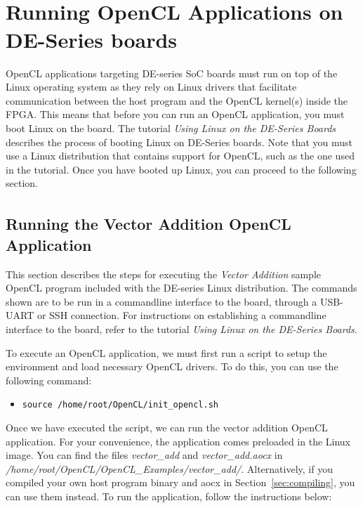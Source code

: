 \documentclass[11pt, twoside, pdftex]{article}
\begin{document}
\section{Running OpenCL\textsuperscript{\texttrademark} Applications on DE-Series boards}
\label{sec:run_app}

OpenCL applications targeting DE-series SoC boards must run on top of the Linux operating system as they rely on Linux drivers that facilitate communication between the host program and the OpenCL kernel(s) inside the FPGA. This means that before you can run an OpenCL application, you must boot Linux on the board. The tutorial \textit{Using Linux on the DE-Series Boards} describes the process of booting Linux on DE-Series boards. Note that you must use a Linux distribution that contains support for OpenCL, such as the one used in the tutorial. Once you have booted up Linux, you can proceed to the following section.

\subsection{Running the Vector Addition OpenCL\textsuperscript{\texttrademark} Application}
\label{sec:run_application}

This section describes the steps for executing the \textit{Vector Addition} sample OpenCL program included with the DE-series Linux distribution. The commands shown are to be run in a commandline interface to the board, through a USB-UART or SSH connection. For instructions on establishing a commandline interface to the board, refer to the tutorial \textit{Using Linux on the DE-Series Boards}. 

To execute an OpenCL application, we must first run a script to setup the environment and load necessary OpenCL drivers. To do this, you can use the following command:

\begin{itemize}
\item[] \texttt{source /home/root/OpenCL/init\_opencl.sh}
\end{itemize}

Once we have executed the script, we can run the vector addition OpenCL application. For your convenience, the application comes preloaded in the Linux image. You can find the files \textit{vector\_add} and \textit{vector\_add.aocx} in \textit{/home/root/OpenCL/OpenCL\_Examples/vector\_add/}. Alternatively, if you compiled your own host program binary and aocx in Section~\ref{sec:compiling}, you can use them instead. To run the application, follow the instructions below:
\end{document}
